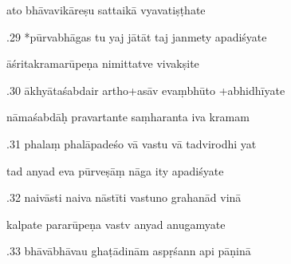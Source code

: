 \documentclass[article,12pt,a4paper]{memoir}%
\newcounter{parCount}
\begin{document}
	  
	  \pstart \leavevmode%
	ato bhāvavikāreṣu sattaikā vyavatiṣṭhate 
	{}
	\pend%
      

	  
	  \pstart {}.29 *pūrvabhāgas tu yaj jātāt taj janmety apadiśyate 
	{}
	\pend%
      

	  
	  \pstart \leavevmode%
	āśritakramarūpeṇa nimittatve vivakṣite 
	{}
	\pend%
      

	  
	  \pstart {}.30 ākhyātaśabdair artho+asāv evaṃbhūto +abhidhīyate 
	{}
	\pend%
      

	  
	  \pstart \leavevmode%
	nāmaśabdāḥ pravartante saṃharanta iva kramam 
	{}
	\pend%
      

	  
	  \pstart {}.31 phalaṃ phalāpadeśo vā vastu vā tadvirodhi yat 
	{}
	\pend%
      

	  
	  \pstart \leavevmode%
	tad anyad eva pūrveṣāṃ nāga ity apadiśyate 
	{}
	\pend%
      

	  
	  \pstart {}.32 naivāsti naiva nāstīti vastuno grahanād vinā 
	{}
	\pend%
      

	  
	  \pstart \leavevmode%
	kalpate pararūpeṇa vastv anyad anugamyate 
	{}
	\pend%
      

	  
	  \pstart {}.33 bhāvābhāvau ghaṭādinām aspṛśann api pāṇinā 
	{}
	\pend%
      
\end{document}
